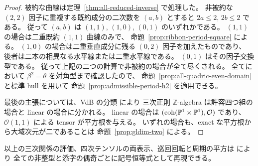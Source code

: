 \begin{proof}
被約な曲線は定理~\ref{thm:all-reduced-inverse} で処理した。
非被約な $(2,2)$ 因子に重複する既約成分の二次数を $(a,b)$ とすると
$2a\le2$, $2b\le2$ である。
従って $(a,b)$ は $(1,1)$, $(1,0)$, $(0,1)$ のいずれかである。
$(1,1)$ の場合は二重既約 $(1,1)$ 曲線のみで、
命題~\ref{prop:ribbon-period-square} による。
$(1,0)$ の場合は二重垂直成分に残る $(0,2)$ 因子を加えたものであり、
後者は二本の相異なる水平線または二重水平線である。
$(0,1)$ はその因子交換型である。
従って上記の二つの計算で非被約の場合が全て尽くされる。
全てにおいて $\beta^2=\theta$ を対角型まで確認したので、
命題~\ref{prop:all-quadric-even-domain} と標準 hull を用いて
命題~\ref{prop:admissible-period-h2} を適用できる。

最後の主張については、VdB の分類
\cite[arXiv v3, Theorem 5.5.10]{VdB2011} により
三次正則 $\mathbb Z$-algebra は許容四つ組の場合と linear の場合に分かれる。
linear の場合は $(\operatorname{coh}(\mathbb P^1\times\mathbb P^1),\mathcal O)$ であり、
$\mathcal O(1,1)$ による tensor が平方根を与える。
いずれの場合も、exact な平方根から大域次元が二であることは
命題~\ref{prop:gldim-two} による。
\end{proof}


以上の三次関係の評価、四次テンソルの両表示、巡回回転と周期の平方は
 により
全ての非整型と添字の偶奇ごとに記号恒等式として再現できる。
